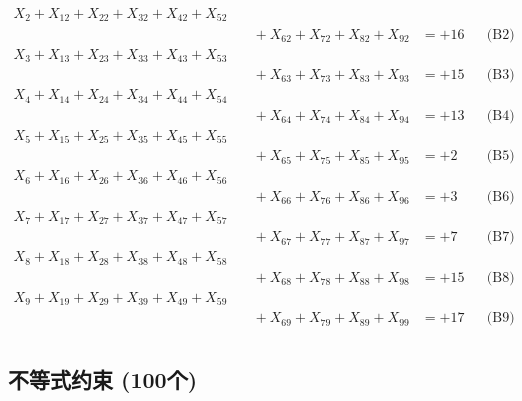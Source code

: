 \documentclass[a4paper,10pt]{article}
\begin{document}
{\begin{align}
X_{2} + X_{12} + X_{22} + X_{32} + X_{42} + X_{52} \\[0.1ex]
&\quad  + X_{62} + X_{72} + X_{82} + X_{92} &= +16 && \text{(B2)} \\
X_{3} + X_{13} + X_{23} + X_{33} + X_{43} + X_{53} \\[0.1ex]
&\quad  + X_{63} + X_{73} + X_{83} + X_{93} &= +15 && \text{(B3)} \\
X_{4} + X_{14} + X_{24} + X_{34} + X_{44} + X_{54} \\[0.1ex]
&\quad  + X_{64} + X_{74} + X_{84} + X_{94} &= +13 && \text{(B4)} \\
\allowbreak
X_{5} + X_{15} + X_{25} + X_{35} + X_{45} + X_{55} \\[0.1ex]
&\quad  + X_{65} + X_{75} + X_{85} + X_{95} &= +2 && \text{(B5)} \\
X_{6} + X_{16} + X_{26} + X_{36} + X_{46} + X_{56} \\[0.1ex]
&\quad  + X_{66} + X_{76} + X_{86} + X_{96} &= +3 && \text{(B6)} \\
X_{7} + X_{17} + X_{27} + X_{37} + X_{47} + X_{57} \\[0.1ex]
&\quad  + X_{67} + X_{77} + X_{87} + X_{97} &= +7 && \text{(B7)} \\
X_{8} + X_{18} + X_{28} + X_{38} + X_{48} + X_{58} \\[0.1ex]
&\quad  + X_{68} + X_{78} + X_{88} + X_{98} &= +15 && \text{(B8)} \\
X_{9} + X_{19} + X_{29} + X_{39} + X_{49} + X_{59} \\[0.1ex]
&\quad  + X_{69} + X_{79} + X_{89} + X_{99} &= +17 && \text{(B9)} \\
\end{align}
}

\subsection{不等式约束 (100个)}
\end{document}
